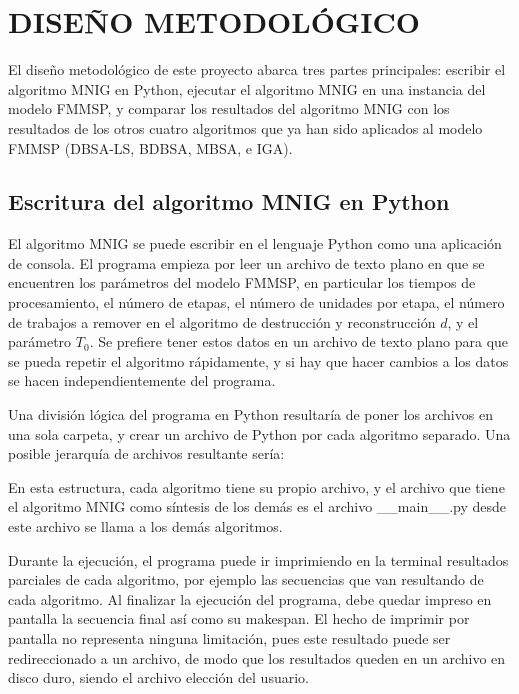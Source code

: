 \documentclass{article}
\begin{document}
\section{DISEÑO METODOLÓGICO}

El diseño metodológico de este proyecto abarca tres partes principales: escribir el algoritmo MNIG en Python, ejecutar el algoritmo MNIG en una instancia del modelo FMMSP, y comparar los resultados del algoritmo MNIG con los resultados de los otros cuatro algoritmos que ya han sido aplicados al modelo FMMSP (DBSA-LS, BDBSA, MBSA, e IGA).

\subsection{Escritura del algoritmo MNIG en Python}

El algoritmo MNIG se puede escribir en el lenguaje Python como una aplicación de consola. El programa empieza por leer un archivo de texto plano en que se encuentren los parámetros del modelo FMMSP, en particular los tiempos de procesamiento, el número de etapas, el número de unidades por etapa, el número de trabajos a remover en el algoritmo de destrucción y reconstrucción $d$, y el parámetro $T_{0}$. Se prefiere tener estos datos en un archivo de texto plano para que se pueda repetir el algoritmo rápidamente, y si hay que hacer cambios a los datos se hacen independientemente del programa.

\vspace{\baselineskip}
Una división lógica del programa en Python resultaría de poner los archivos en una sola carpeta, y crear un archivo de Python por cada algoritmo separado. Una posible jerarquía de archivos resultante sería:

\vspace{\baselineskip}

\vspace{\baselineskip}
En esta estructura, cada algoritmo tiene su propio archivo, y el archivo que tiene el algoritmo MNIG como síntesis de los demás es el archivo \_\_main\_\_.py desde este archivo se llama a los demás algoritmos.

\vspace{\baselineskip}
Durante la ejecución, el programa puede ir imprimiendo en la terminal resultados parciales de cada algoritmo, por ejemplo las secuencias que van resultando de cada algoritmo. Al finalizar la ejecución del programa, debe quedar impreso en pantalla la secuencia final así como su makespan. El hecho de imprimir por pantalla no representa ninguna limitación, pues este resultado puede ser redireccionado a un archivo, de modo que los resultados queden en un archivo en disco duro, siendo el archivo elección del usuario.
\end{document}
